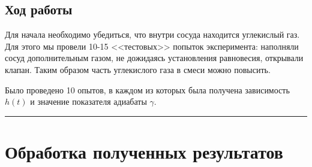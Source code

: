 \documentclass[a4paper,12pt]{report}
\begin{document}
\begin{multicols}{2}
    \subsection*{Ход работы}
    Для начала необходимо убедиться, что внутри сосуда находится углекислый газ. Для этого мы провели 10-15 <<тестовых>> попыток эксперимента: наполняли сосуд дополнительным газом, не дожидаясь установления равновесия, открывали клапан. Таким образом часть углекислого газа в смеси можно повысить.

    Было проведено 10 опытов, в каждом из которых была получена зависимость $h(t)$ и значение показателя адиабаты $\gamma$.
    \end{multicols}
    \vspace{{2mm}}
    \hrule

    \section{Обработка полученных результатов}
\end{document}
